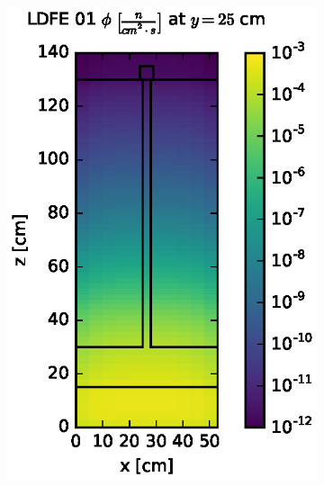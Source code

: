\begin{figure}[!htb]
\begin{subfigure}{0.4\textwidth}
\includegraphics[max height=0.445\textheight]
{img/steel-plots/fwd/flux-ldfe01-slice.eps}
\end{subfigure} ~
\begin{subfigure}{0.4\textwidth}

\end{subfigure}
\end{figure}
